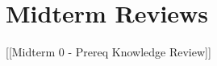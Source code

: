\chapter{Midterm Reviews }
\hypertarget{md__midterm_01_reviews_2_midterm_01_reviews}{}\label{md__midterm_01_reviews_2_midterm_01_reviews}

\begin{DoxyItemize}
\item \mbox{[}\mbox{[}Midterm 0 -\/ Prereq Knowledge Review\mbox{]}\mbox{]}
\item 
\end{DoxyItemize}